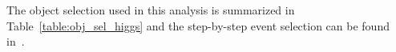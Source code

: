 The object selection used in this analysis is summarized in Table~\ref{table:obj_sel_higgs} and the step-by-step event selection can be found in~\cite{PhysRevLett.114.191803}. %
